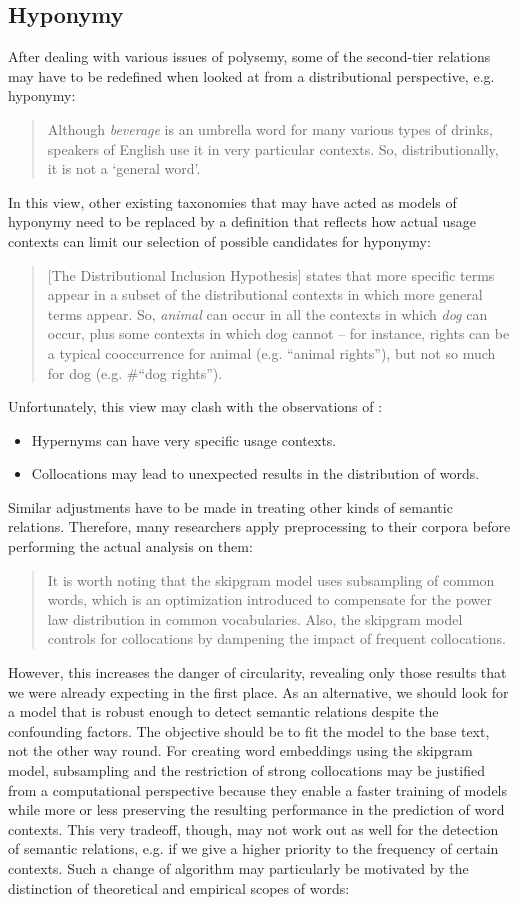 \documentclass[jou]{apa6} %
\begin{document}
\subsection{Hyponymy}

After dealing with various issues of polysemy, some of the second-tier relations may have to be redefined when looked at from a distributional perspective, e.g. hyponymy:
\blockquote[{\cite[p.~443]{herbelotMeasuringSemanticContent2013}}]{Although \textit{beverage} is an umbrella word for many various types of drinks, speakers of English use it in very particular contexts. So, distributionally, it is not a ‘general word’.}
In this view, other existing taxonomies that may have acted as models of hyponymy need to be replaced by a definition that reflects how actual usage contexts can limit our selection of possible candidates for hyponymy:
\blockquote[{\cite[p.~443]{rollerInclusiveSelectiveSupervised2014}}]{[The Distributional Inclusion Hypothesis] states that more specific terms appear in a subset of the distributional contexts in which more general terms appear. So, \textit{animal} can occur in all the contexts in which \textit{dog} can occur, plus some contexts in which dog cannot – for instance, rights can be a typical cooccurrence for animal (e.g. “animal rights”), but not so much for dog (e.g. \#“dog rights”).}
Unfortunately, this view may clash with the observations of \cite{herbelotMeasuringSemanticContent2013}:
\begin{itemize}
      \item Hypernyms can have very specific usage contexts.
      \item Collocations may lead to unexpected results in the distribution of words.
\end{itemize}
Similar adjustments have to be made in treating other kinds of semantic relations. Therefore, many researchers apply preprocessing to their corpora before performing the actual analysis on them:
\blockquote[{\cite[p.~56f.]{gyllenstenRgramsUnsupervisedLearning2019}}]{It is worth noting that the skipgram model uses subsampling of common words, which is an optimization introduced to compensate for the power law distribution in common vocabularies. Also, the skipgram model controls for collocations by dampening the impact of frequent collocations.}
However, this increases the danger of circularity, revealing only those results that we were already expecting in the first place. As an alternative, we should look for a model that is robust enough to detect semantic relations despite the confounding factors. The objective should be to fit the model to the base text, not the other way round. For creating word embeddings using the skipgram model, subsampling and the restriction of strong collocations may be justified from a computational perspective because they enable a faster training of models while more or less preserving the resulting performance in the prediction of word contexts. This very tradeoff, though, may not work out as well for the detection of semantic relations, e.g. if we give a higher priority to the frequency of certain contexts. Such a change of algorithm may particularly be motivated by the distinction of theoretical and empirical scopes of words:
\end{document}
